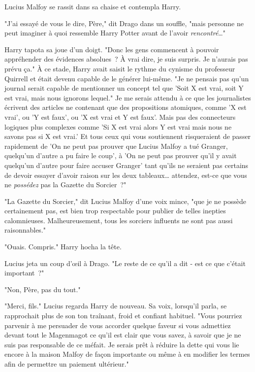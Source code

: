 Lucius Malfoy se rassit dans sa chaise et contempla Harry.

"J'ai essayé de vous le dire, Père," dit Drago dans un souffle, "mais personne ne peut imaginer à quoi ressemble Harry Potter avant de l'avoir \emph{rencontré}…"

Harry tapota sa joue d'un doigt. "Donc les gens commencent à pouvoir appréhender des évidences absolues~? À vrai dire, je suis surpris. Je n'aurais pas prévu ça." À ce stade, Harry avait saisit le rythme du cynisme du professeur Quirrell et était devenu capable de le générer lui-même. "Je ne pensais pas qu'un journal serait capable de mentionner un concept tel que 'Soit X est vrai, soit Y est vrai, mais nous ignorons lequel." Je me serais attendu à ce que les journalistes écrivent des articles ne contenant que des propositions atomiques, comme 'X est vrai', ou 'Y est faux', ou 'X est vrai et Y est faux'. Mais pas des connecteurs logiques plus complexes comme 'Si X est vrai alors Y est vrai mais nous ne savons pas si X est vrai.' Et tous ceux qui vous soutiennent risqueraient de passer rapidement de 'On ne peut pas prouver que Lucius Malfoy a tué Granger, quelqu'un d'autre a pu faire le coup', à 'On ne peut pas prouver qu'il y avait quelqu'un d'autre pour faire accuser Granger' tant qu'ils ne seraient pas certains de devoir essayer d'avoir raison sur les deux tableaux… attendez, est-ce que vous ne \emph{possédez} pas la Gazette du Sorcier~?"

"La Gazette du Sorcier," dit Lucius Malfoy d'une voix mince, "que je ne possède certainement pas, est bien trop respectable pour publier de telles inepties calomnieuses. Malheureusement, tous les sorciers influents ne sont pas aussi raisonnables."

"Ouais. Compris." Harry hocha la tête.

Lucius jeta un coup d'œil à Drago. "Le reste de ce qu'il a dit - est ce que c'était important~?"

"Non, Père, pas du tout."

"Merci, fils." Lucius regarda Harry de nouveau. Sa voix, lorsqu'il parla, se rapprochait plus de son ton traînant, froid et confiant habituel. "Vous pourriez parvenir à me persuader de vous accorder quelque faveur si vous admettiez devant tout le Magenmagot ce qu'il est clair que vous savez, à savoir que je ne suis pas responsable de ce méfait. Je serais prêt à réduire la dette qui vous lie encore à la maison Malfoy de façon importante ou même à en modifier les termes afin de permettre un paiement ultérieur."

